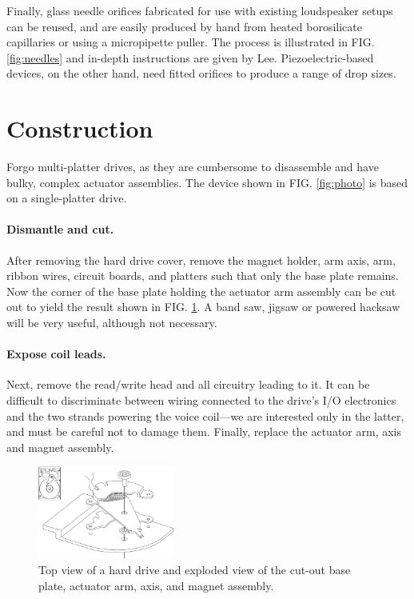 \documentclass[aip,rsi,reprint,graphicx]{revtex4-1} %
\begin{document}
Finally, glass needle orifices fabricated for use with existing loudspeaker setups can be
reused, and are easily produced by hand from heated borosilicate capillaries or
using a micropipette puller. The process is illustrated in FIG.
\ref{fig:needles} and in-depth instructions are given by Lee\cite{Lee02}.
Piezoelectric-based devices, on the other hand, need fitted orifices to produce a range of
drop sizes.
\section{Construction}
Forgo multi-platter drives, as they are cumbersome to disassemble and have
bulky, complex actuator assemblies. The device shown in FIG. \ref{fig:photo}
is based on a single-platter drive.

\paragraph{Dismantle and cut.} After removing the hard drive cover, remove
the magnet holder, arm axis, arm, ribbon wires, circuit boards, and platters
such that only the base plate remains. Now the corner of the base plate holding
the actuator arm assembly can be cut out to yield the result shown in FIG.
\ref{fig:designschematic}. A band saw, jigsaw or powered hacksaw will be very
useful, although not necessary.

\paragraph{Expose coil leads.} Next, remove the read/write head and all
circuitry leading to it. It can be difficult to discriminate between wiring
connected to the drive's I/O electronics and the two strands powering the voice
coil---we are interested only in the latter, and must be careful not to damage
them. Finally, replace the actuator arm, axis and magnet assembly.
\begin{figure}
\centering
\includegraphics[width=0.4\textwidth]{hdg_images/dropletgenerator_exploded.pdf}
\caption{Top view of a hard drive and exploded view of the cut-out base
plate, actuator arm, axis, and magnet assembly. \label{fig:designschematic}}
\end{figure}
\end{document}
